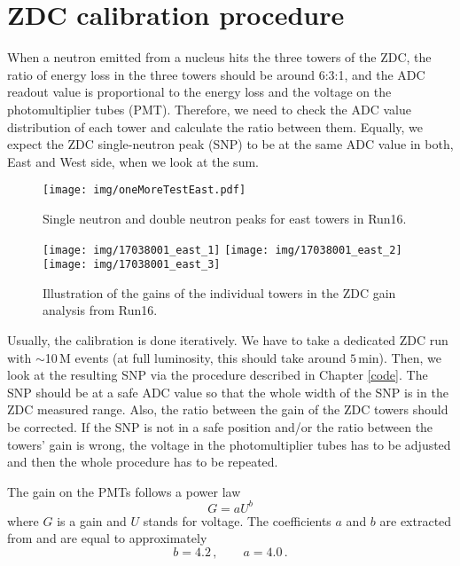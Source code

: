 \section{ZDC calibration procedure}

When a neutron emitted from a nucleus hits the three towers of the ZDC, the ratio of energy loss
in the three towers should be 
around 6:3:1, and the ADC readout value is proportional to the energy loss and the voltage on the
photomultiplier tubes (PMT)\@. Therefore, we need to check the ADC value 
distribution of each tower and calculate the ratio between them. Equally, we expect the ZDC 
single-neutron peak (SNP) to
be at the same ADC value in both, East and West side, when we look at the sum.

\begin{figure}[!htb]
\begin{center}
\texttt{[image: img/oneMoreTestEast.pdf]}
\end{center}
\caption{Single neutron and double neutron peaks for east towers in Run16.}
\label{oneMoreTestEast}
\end{figure}

\begin{figure}[htb]
\begin{center}
\texttt{[image: img/17038001\_east\_1]}
\texttt{[image: img/17038001\_east\_2]}
\texttt{[image: img/17038001\_east\_3]}
\end{center}
\caption{Illustration of the gains of the individual towers in the ZDC gain analysis from Run16.}
\label{oneMoreTestEast}
\end{figure}

Usually, the calibration is done iteratively. We have to take a dedicated ZDC run with
$\sim$10$\,$M events (at full luminosity, this should take around $5\,$min). Then, we
look at the resulting SNP via the procedure described in Chapter \ref{code}.
The SNP should be at a safe ADC value so that the whole width of the SNP is in the ZDC measured
range. Also, the ratio between the gain of the ZDC towers should be corrected. If the
SNP is not in a safe position and/or the ratio between the towers' gain is wrong,
the voltage in the photomultiplier tubes has to be adjusted and then the whole procedure
has to be repeated.

The gain on the PMTs follows a power law
\begin{equation}
G = aU^b
\end{equation}
where $G$ is a gain and $U$ stands for voltage. The coefficients $a$ and $b$ are 
extracted from \cite{ZDCvoltsDependence}
and are equal to approximately
\begin{equation}
b=4.2\,, \qquad a=4.0\,.
\end{equation}

